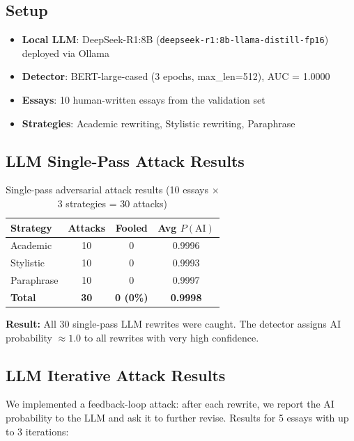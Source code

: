 \documentclass[11pt,a4paper]{article}
\begin{document}
\subsection{Setup}

\begin{itemize}[nosep]
\item \textbf{Local LLM}: DeepSeek-R1:8B (\texttt{deepseek-r1:8b-llama-distill-fp16}) deployed via Ollama
\item \textbf{Detector}: BERT-large-cased (3 epochs, max\_len=512), AUC = 1.0000
\item \textbf{Essays}: 10 human-written essays from the validation set
\item \textbf{Strategies}: Academic rewriting, Stylistic rewriting, Paraphrase
\end{itemize}

\subsection{LLM Single-Pass Attack Results}

\begin{table}[H]
\centering
\caption{Single-pass adversarial attack results (10 essays $\times$ 3 strategies = 30 attacks)}
\label{tab:adversarial}
\begin{tabular}{lccc}
\toprule
\textbf{Strategy} & \textbf{Attacks} & \textbf{Fooled} & \textbf{Avg $P(\text{AI})$} \\
\midrule
Academic    & 10 & 0 & 0.9996 \\
Stylistic   & 10 & 0 & 0.9993 \\
Paraphrase  & 10 & 0 & 0.9997 \\
\midrule
\textbf{Total} & \textbf{30} & \textbf{0 (0\%)} & \textbf{0.9998} \\
\bottomrule
\end{tabular}
\end{table}

\textbf{Result:} All 30 single-pass LLM rewrites were caught. The detector assigns AI probability $\approx 1.0$ to all rewrites with very high confidence.

\subsection{LLM Iterative Attack Results}

We implemented a feedback-loop attack: after each rewrite, we report the AI probability to the LLM and ask it to further revise. Results for 5 essays with up to 3 iterations:
\end{document}
